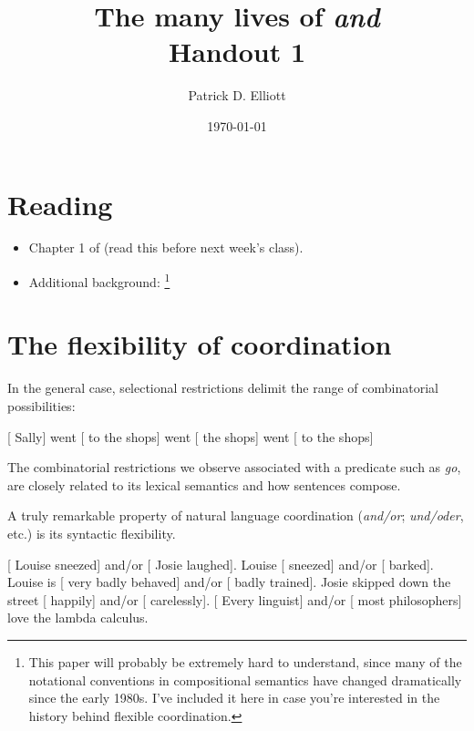 \documentclass[letterpaper,parskip=half]{scrartcl}
\author{Patrick D. Elliott}
\date{\today}
\title{The many lives of \emph{and}\\\medskip
\large Handout 1}
\begin{document}
\maketitle
\tableofcontents


\section{Reading}
\label{sec:org5e75e44}

\begin{itemize}
\item Chapter 1 of \autocite{Winter2001} (read this before next week's class).
\item Additional background: \autocite{ParteeRooth1983}\footnote{This paper will probably be extremely hard to understand, since many of the notational conventions in compositional semantics have changed dramatically since the early 1980s. I've included it here in case you're interested in the history behind flexible coordination.}
\end{itemize}

\section{The flexibility of coordination}
\label{sec:orgaa113e9}

In the general case, selectional restrictions delimit the range of combinatorial possibilities:

\begin{exe}
  \ex {}[ Sally] went [ to the shops]
   went [ the shops]
   went [ to the shops]
\end{exe}

The combinatorial restrictions we observe associated with a predicate such as \emph{go}, are closely related to its lexical semantics and how sentences compose. 

A truly remarkable property of natural language coordination (\emph{and/or}; \emph{und/oder}, etc.) is its syntactic flexibility.

\begin{exe}
  \ex {}[ Louise sneezed] and/or [ Josie laughed].
  \ex Louise [ sneezed] and/or [ barked].
  \ex Louise is [ very badly behaved] and/or [
  badly trained].
  \ex Josie skipped down the street [ happily] and/or
  [ carelessly].
  \ex {}[ Every linguist] and/or [ most philosophers]
  love the lambda calculus.
\end{exe}
\end{document}
